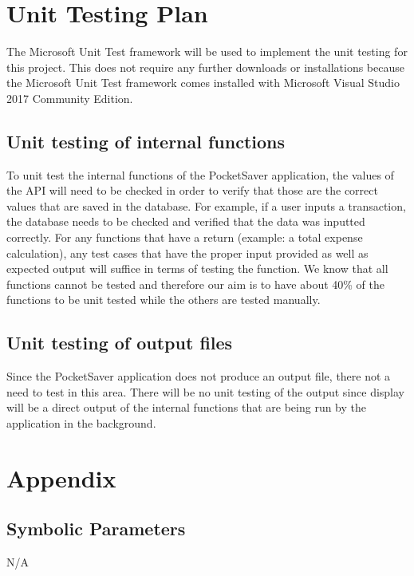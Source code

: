 \documentclass[12pt, titlepage]{article}
\begin{document}
\section{Unit Testing Plan}
The Microsoft Unit Test framework will be used to implement the unit testing for this project. This does not require any further downloads or installations because the Microsoft Unit Test framework comes installed with Microsoft Visual Studio 2017 Community Edition. 
		
\subsection{Unit testing of internal functions}

To unit test the internal functions of the PocketSaver application, the values of the API will need to be checked in order to verify that those are the correct values that are saved in the database. For example, if a user inputs a transaction, the database needs to be checked and verified that the data was inputted correctly. For any functions that have a return (example: a total expense calculation), any test cases that have the proper input provided as well as expected output will suffice in terms of testing the function. We know that all functions cannot be tested and therefore our aim is to have about 40\% of the functions to be unit tested while the others are tested manually.
		
\subsection{Unit testing of output files}	
Since the PocketSaver application does not produce an output file, there not a need to test in this area. There will be no unit testing of the output since display will be a direct output of the internal functions that are being run by the application in the background.	





\newpage

\section{Appendix}


\subsection{Symbolic Parameters}
N/A
\end{document}
